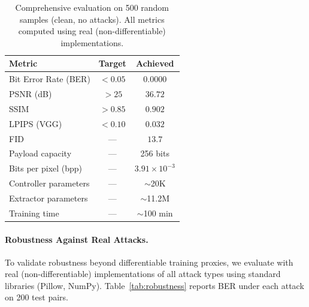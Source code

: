 \documentclass[10pt, twocolumn]{article}
\begin{document}
\begin{table}[t]
\centering
\caption{Comprehensive evaluation on 500 random samples (clean, no attacks). All metrics computed using real (non-differentiable) implementations.}
\label{tab:main_results}
\begin{tabular}{@{}lcc@{}}
\toprule
\textbf{Metric} & \textbf{Target} & \textbf{Achieved} \\
\midrule
Bit Error Rate (BER)        & $< 0.05$ & $\mathbf{0.0000}$ \\
PSNR (dB)                   & $> 25$   & $\mathbf{36.72}$ \\
SSIM                        & $> 0.85$ & $\mathbf{0.902}$ \\
LPIPS (VGG)                 & $< 0.10$ & $\mathbf{0.032}$ \\
FID                         & ---      & $\mathbf{13.7}$ \\
\midrule
Payload capacity             & ---      & 256 bits \\
Bits per pixel (bpp)         & ---      & $3.91 \times 10^{-3}$ \\
Controller parameters        & ---      & $\sim$20K \\
Extractor parameters         & ---      & $\sim$11.2M \\
Training time                & ---      & $\sim$100 min \\
\bottomrule
\end{tabular}
\end{table}

\paragraph{Robustness Against Real Attacks.}
To validate robustness beyond differentiable training proxies, we evaluate with real (non-differentiable) implementations of all attack types using standard libraries (Pillow, NumPy).
Table~\ref{tab:robustness} reports BER under each attack on 200 test pairs.
\end{document}
